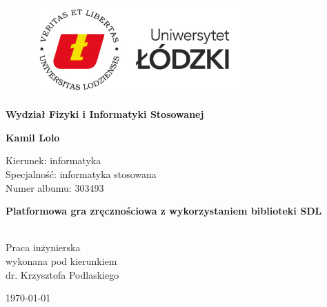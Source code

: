 \documentclass[12pt, a4paper, oneside]{Thesis} %
\begin{document}
\begin{titlepage}
\begin{center}

\begin{figure}
    \centering
    \includegraphics[width=300px]{./Pictures/logo.jpg}
\end{figure}

\begin{center}
{\Large \bfseries Wydział Fizyki i Informatyki Stosowanej }\\[0.4cm] 
\end{center}

\addvspace{40pt}

{\Large \bfseries Kamil Lolo }\\[0.4cm] %

\addvspace{40pt}
 
\begin{flushleft} 
Kierunek: informatyka\\
Specjalność:  informatyka stosowana \\
Numer albumu: 303493 \\
\end{flushleft}
 
\begin{center}
{\Large \bfseries Platformowa gra zręcznościowa z wykorzystaniem biblioteki SDL }\\[0.4cm] 
\end{center}

\addvspace{35pt}
\begin{minipage}{0.4\textwidth}
\begin{flushleft} \large
\emph{ }
\end{flushleft}
\end{minipage}
\begin{minipage}{0.4\textwidth}
\begin{flushright} \large
\emph{ } \\
Praca inżynierska \\ wykonana pod kierunkiem \\ dr. Krzysztofa Podlaskiego
\end{flushright}
\end{minipage}

\vfill
\addvspace{150pt}
{\large \today}\\[4cm] %
\end{center}
\end{titlepage}
\end{document}

